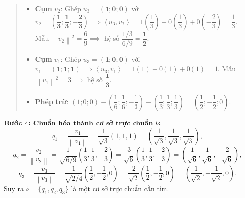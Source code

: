 \documentclass[12pt,a4paper]{article}
\newcommand{\ip}[2]{\left\langle #1,#2\right\rangle}
\newcommand{\norm}[1]{\left\|#1\right\|}
\begin{document}
\begin{quote}
\small
\noindent{}\par\vspace{3pt}
\begin{itemize}[noitemsep,topsep=2pt]
\item \textbf{Cụm $v_2$}: Ghép $u_3 = (\mathbf{1}; \mathbf{0}; \mathbf{0})$ với $v_2 = \left(\mathbf{\dfrac{1}{3}}; \mathbf{\dfrac{1}{3}}; \mathbf{-\dfrac{2}{3}}\right) \implies \ip{u_3}{v_2} = 1\left(\dfrac{1}{3}\right) + 0\left(\dfrac{1}{3}\right) + 0\left(-\dfrac{2}{3}\right) = \dfrac{1}{3}$. Mẫu $\norm{v_2}^2 = \dfrac{6}{9} \implies$ hệ số $\dfrac{1/3}{6/9} = \mathbf{\dfrac{1}{2}}$.
\item \textbf{Cụm $v_1$}: Ghép $u_3 = (\mathbf{1}; \mathbf{0}; \mathbf{0})$ với $v_1 = (\mathbf{1}; \mathbf{1}; \mathbf{1}) \implies \ip{u_3}{v_1} = 1(1) + 0(1) + 0(1) = 1$. Mẫu $\norm{v_1}^2 = 3 \implies$ hệ số $\mathbf{\dfrac{1}{3}}$.
\item \textbf{Phép trừ}: $(1; 0; 0) - \left(\dfrac{1}{6}; \dfrac{1}{6}; -\dfrac{1}{3}\right) - \left(\dfrac{1}{3}; \dfrac{1}{3}; \dfrac{1}{3}\right) = \left(\dfrac{1}{2}; -\dfrac{1}{2}; 0\right)$.
\end{itemize}
\end{quote}

\vspace{0.2cm}
\textbf{Bước 4: Chuẩn hóa thành cơ sở trực chuẩn $b$:}
\[
q_1 = \frac{v_1}{\norm{v_1}} = \frac{1}{\sqrt{3}}(1, 1, 1) = \left(\frac{1}{\sqrt{3}}, \frac{1}{\sqrt{3}}, \frac{1}{\sqrt{3}}\right),
\]
\[
q_2 = \frac{v_2}{\norm{v_2}} = \frac{1}{\sqrt{6/9}}\left(\frac{1}{3}, \frac{1}{3}, -\frac{2}{3}\right) = \frac{3}{\sqrt{6}}\left(\frac{1}{3}, \frac{1}{3}, -\frac{2}{3}\right) = \left(\frac{1}{\sqrt{6}}, \frac{1}{\sqrt{6}}, -\frac{2}{\sqrt{6}}\right),
\]
\[
q_3 = \frac{v_3}{\norm{v_3}} = \frac{1}{\sqrt{2/4}}\left(\frac{1}{2}, -\frac{1}{2}, 0\right) = \frac{2}{\sqrt{2}}\left(\frac{1}{2}, -\frac{1}{2}, 0\right) = \left(\frac{1}{\sqrt{2}}, -\frac{1}{\sqrt{2}}, 0\right).
\]
Suy ra $b = \{q_1, q_2, q_3\}$ là một cơ sở trực chuẩn cần tìm.
\end{document}

